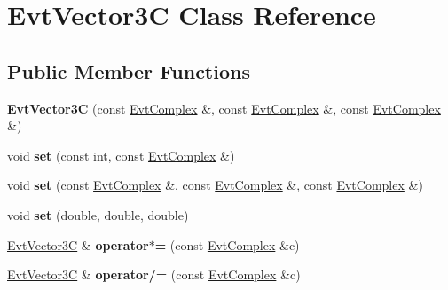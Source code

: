 \hypertarget{class_evt_vector3_c}{}\section{Evt\+Vector3\+C Class Reference}
\label{class_evt_vector3_c}
\subsection*{Public Member Functions}
\begin{DoxyCompactItemize}
\item 
\hypertarget{class_evt_vector3_c_a1e6e5ed53254a9403235885a6aa288aa}{}{\bfseries Evt\+Vector3\+C} (const \hyperlink{class_evt_complex}{Evt\+Complex} \&, const \hyperlink{class_evt_complex}{Evt\+Complex} \&, const \hyperlink{class_evt_complex}{Evt\+Complex} \&)\label{class_evt_vector3_c_a1e6e5ed53254a9403235885a6aa288aa}

\item 
\hypertarget{class_evt_vector3_c_adbe1197cd6249060cd53ec7ccc0496e2}{}void {\bfseries set} (const int, const \hyperlink{class_evt_complex}{Evt\+Complex} \&)\label{class_evt_vector3_c_adbe1197cd6249060cd53ec7ccc0496e2}

\item 
\hypertarget{class_evt_vector3_c_afda040b374354bb74dbfe52eefaa3c96}{}void {\bfseries set} (const \hyperlink{class_evt_complex}{Evt\+Complex} \&, const \hyperlink{class_evt_complex}{Evt\+Complex} \&, const \hyperlink{class_evt_complex}{Evt\+Complex} \&)\label{class_evt_vector3_c_afda040b374354bb74dbfe52eefaa3c96}

\item 
\hypertarget{class_evt_vector3_c_afb52b87447eff053a3f2377ed6b00658}{}void {\bfseries set} (double, double, double)\label{class_evt_vector3_c_afb52b87447eff053a3f2377ed6b00658}

\item 
\hypertarget{class_evt_vector3_c_ac659d76e7c0333df26e1f36d2bce9710}{}\hyperlink{class_evt_vector3_c}{Evt\+Vector3\+C} \& {\bfseries operator$\ast$=} (const \hyperlink{class_evt_complex}{Evt\+Complex} \&c)\label{class_evt_vector3_c_ac659d76e7c0333df26e1f36d2bce9710}

\item 
\hypertarget{class_evt_vector3_c_a5e514fe925427deeb29e6a15de23bf03}{}\hyperlink{class_evt_vector3_c}{Evt\+Vector3\+C} \& {\bfseries operator/=} (const \hyperlink{class_evt_complex}{Evt\+Complex} \&c)\label{class_evt_vector3_c_a5e514fe925427deeb29e6a15de23bf03}


\end{DoxyCompactItemize}
